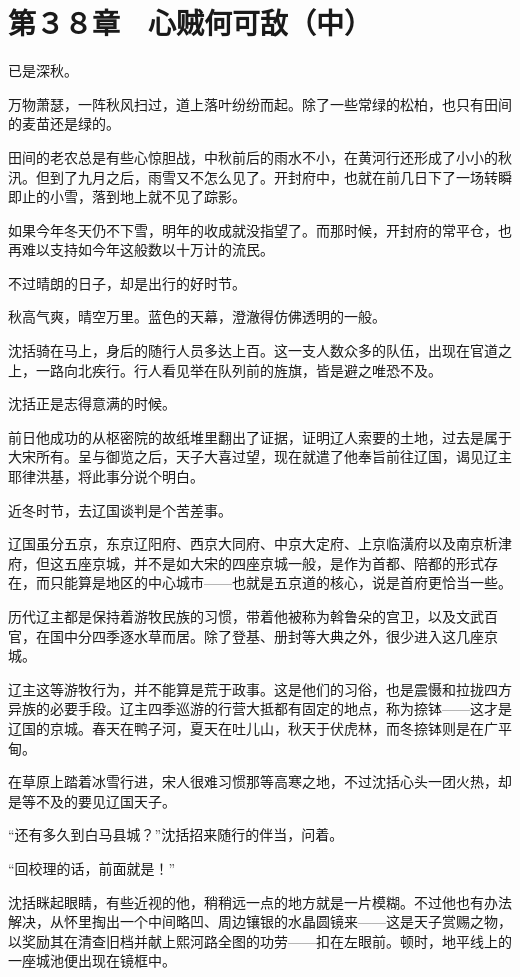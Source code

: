 \section{第３８章　心贼何可敌（中）}

已是深秋。

万物萧瑟，一阵秋风扫过，道上落叶纷纷而起。除了一些常绿的松柏，也只有田间的麦苗还是绿的。

田间的老农总是有些心惊胆战，中秋前后的雨水不小，在黄河行还形成了小小的秋汛。但到了九月之后，雨雪又不怎么见了。开封府中，也就在前几日下了一场转瞬即止的小雪，落到地上就不见了踪影。

如果今年冬天仍不下雪，明年的收成就没指望了。而那时候，开封府的常平仓，也再难以支持如今年这般数以十万计的流民。

不过晴朗的日子，却是出行的好时节。

秋高气爽，晴空万里。蓝色的天幕，澄澈得仿佛透明的一般。

沈括骑在马上，身后的随行人员多达上百。这一支人数众多的队伍，出现在官道之上，一路向北疾行。行人看见举在队列前的旌旗，皆是避之唯恐不及。

沈括正是志得意满的时候。

前日他成功的从枢密院的故纸堆里翻出了证据，证明辽人索要的土地，过去是属于大宋所有。呈与御览之后，天子大喜过望，现在就遣了他奉旨前往辽国，谒见辽主耶律洪基，将此事分说个明白。

近冬时节，去辽国谈判是个苦差事。

辽国虽分五京，东京辽阳府、西京大同府、中京大定府、上京临潢府以及南京析津府，但这五座京城，并不是如大宋的四座京城一般，是作为首都、陪都的形式存在，而只能算是地区的中心城市——也就是五京道的核心，说是首府更恰当一些。

历代辽主都是保持着游牧民族的习惯，带着他被称为斡鲁朵的宫卫，以及文武百官，在国中分四季逐水草而居。除了登基、册封等大典之外，很少进入这几座京城。

辽主这等游牧行为，并不能算是荒于政事。这是他们的习俗，也是震慑和拉拢四方异族的必要手段。辽主四季巡游的行营大抵都有固定的地点，称为捺钵——这才是辽国的京城。春天在鸭子河，夏天在吐儿山，秋天于伏虎林，而冬捺钵则是在广平甸。

在草原上踏着冰雪行进，宋人很难习惯那等高寒之地，不过沈括心头一团火热，却是等不及的要见辽国天子。

“还有多久到白马县城？”沈括招来随行的伴当，问着。

“回校理的话，前面就是！”

沈括眯起眼睛，有些近视的他，稍稍远一点的地方就是一片模糊。不过他也有办法解决，从怀里掏出一个中间略凹、周边镶银的水晶圆镜来——这是天子赏赐之物，以奖励其在清查旧档并献上熙河路全图的功劳——扣在左眼前。顿时，地平线上的一座城池便出现在镜框中。

